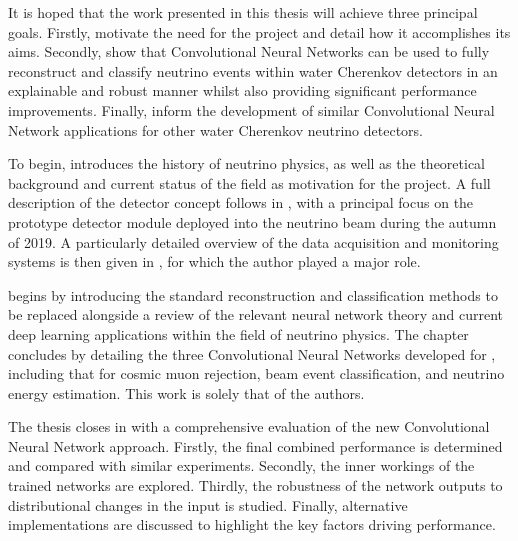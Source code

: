 It is hoped that the work presented in this thesis will achieve three principal goals. Firstly,
motivate the need for the \chips project and detail how it accomplishes its aims. Secondly, show
that Convolutional Neural Networks can be used to fully reconstruct and classify neutrino events
within water Cherenkov detectors in an explainable and robust manner whilst also providing
significant performance improvements. Finally, inform the development of similar Convolutional
Neural Network applications for other water Cherenkov neutrino detectors.

To begin,  introduces the history of neutrino physics, as well as the
theoretical background and current status of the field as motivation for the \chips project. A
full description of the \chips detector concept follows in , with a
principal focus on the \chipsfive prototype detector module deployed into the \numi neutrino beam
during the autumn of 2019. A particularly detailed overview of the \chipsfive data acquisition and
monitoring systems is then given in , for which the author played a major
role.

 begins by introducing the standard reconstruction and classification methods
to be replaced alongside a review of the relevant neural network theory and current deep learning
applications within the field of neutrino physics. The chapter concludes by detailing the three
Convolutional Neural Networks developed for \chipsfive, including that for cosmic muon rejection,
beam event classification, and neutrino energy estimation. This work is solely that of the
authors.

The thesis closes in  with a comprehensive evaluation of the new
Convolutional Neural Network approach. Firstly, the final combined performance is determined and
compared with similar experiments. Secondly, the inner workings of the trained networks are
explored. Thirdly, the robustness of the network outputs to distributional changes in the input is
studied. Finally, alternative implementations are discussed to highlight the key factors driving
performance.